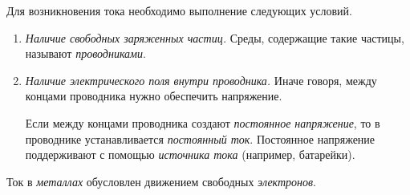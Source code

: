 \documentclass[main.tex]{subfiles}
\begin{document}
\begin{NoHyper}
Для возникновения тока необходимо выполнение следующих условий.
\begin{enumerate}
    \item \emph{Наличие свободных заряженных частиц.} Среды, содержащие такие частицы, называют \emph{проводниками}.

    \item \emph{Наличие электрического поля внутри проводника.} Иначе говоря, между концами проводника нужно обеспечить напряжение.

    Если между концами проводника создают \emph{постоянное напряжение}, то в проводнике устанавливается \emph{постоянный ток}. Постоянное напряжение поддерживают с помощью \emph{источника тока} (например, батарейки).
\end{enumerate}

Ток в \emph{металлах} обусловлен движением свободных \emph{электронов}.









\end{NoHyper}
\end{document}
